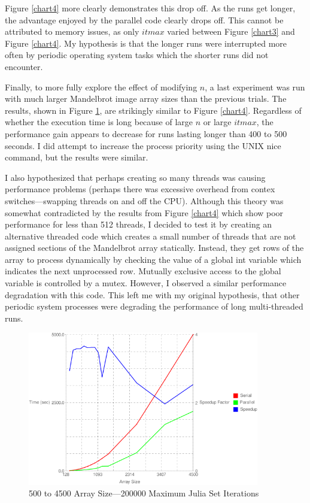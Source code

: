 \documentclass{article}
\begin{document}
Figure \ref{chart4} more clearly demonstrates this drop off. As the runs get longer, the advantage enjoyed by the parallel code clearly drops off. This cannot be attributed to memory issues, as only \(itmax\) varied between Figure \ref{chart3} and Figure \ref{chart4}. My hypothesis is that the longer runs were interrupted more often by periodic operating system tasks which the shorter runs did not encounter.

Finally, to more fully explore the effect of modifying \(n\), a last experiment was run with much larger Mandelbrot image array sizes than the previous trials. The results, shown in Figure \ref{chart5}, are strikingly similar to Figure \ref{chart4}. Regardless of whether the execution time is long because of large \(n\) or large \(itmax\), the performance gain appears to decrease for runs lasting longer than 400 to 500 seconds. I did attempt to increase the process priority using the UNIX nice command, but the results were similar.

I also hypothesized that perhaps creating so many threads was causing performance problems (perhaps there was excessive overhead from contex switches---swapping threads on and off the CPU). Although this theory was somewhat contradicted by the results from Figure \ref{chart4} which show poor performance for less than 512 threads, I decided to test it by creating an alternative threaded code which creates a small number of threads that are not assigned sections of the Mandelbrot array statically. Instead, they get rows of the array to process dynamically by checking the value of a global int variable which indicates the next unprocessed row. Mutually exclusive access to the global variable is controlled by a mutex. However, I observed a similar performance degradation with this code. This left me with my original hypothesis, that other periodic system processes were degrading the performance of long multi-threaded runs.

\begin{figure}
\centering
\includegraphics[width=0.9\textwidth]{chart5nt.png}
\caption{500 to 4500 Array Size---200000 Maximum Julia Set Iterations}
\label{chart5}
\end{figure}
\end{document}

